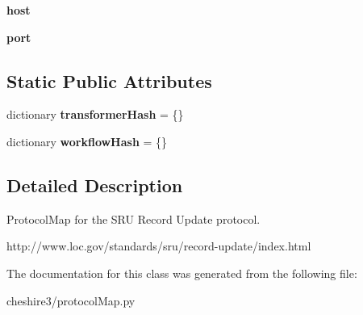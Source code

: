\begin{DoxyCompactItemize}
\item 
\hypertarget{classcheshire3_1_1protocol_map_1_1_update_protocol_map_a3270aad4de436435d8fccf631233e81f}{{\bfseries host}}\label{classcheshire3_1_1protocol_map_1_1_update_protocol_map_a3270aad4de436435d8fccf631233e81f}

\item 
\hypertarget{classcheshire3_1_1protocol_map_1_1_update_protocol_map_a1d46586c4bc729bce87e8ea3f4384c76}{{\bfseries port}}\label{classcheshire3_1_1protocol_map_1_1_update_protocol_map_a1d46586c4bc729bce87e8ea3f4384c76}

\end{DoxyCompactItemize}
\subsection*{Static Public Attributes}
\begin{DoxyCompactItemize}
\item 
\hypertarget{classcheshire3_1_1protocol_map_1_1_update_protocol_map_a5466e33e83f6b9e245a8a0cf1be6231b}{dictionary {\bfseries transformer\-Hash} = \{\}}\label{classcheshire3_1_1protocol_map_1_1_update_protocol_map_a5466e33e83f6b9e245a8a0cf1be6231b}

\item 
\hypertarget{classcheshire3_1_1protocol_map_1_1_update_protocol_map_aaedeb4ad5515247403cd71df3742fa89}{dictionary {\bfseries workflow\-Hash} = \{\}}\label{classcheshire3_1_1protocol_map_1_1_update_protocol_map_aaedeb4ad5515247403cd71df3742fa89}

\end{DoxyCompactItemize}


\subsection{Detailed Description}
\begin{DoxyVerb}ProtocolMap for the SRU Record Update protocol.

http://www.loc.gov/standards/sru/record-update/index.html
\end{DoxyVerb}
 

The documentation for this class was generated from the following file\-:\begin{DoxyCompactItemize}
\item 
cheshire3/protocol\-Map.\-py\end{DoxyCompactItemize}
